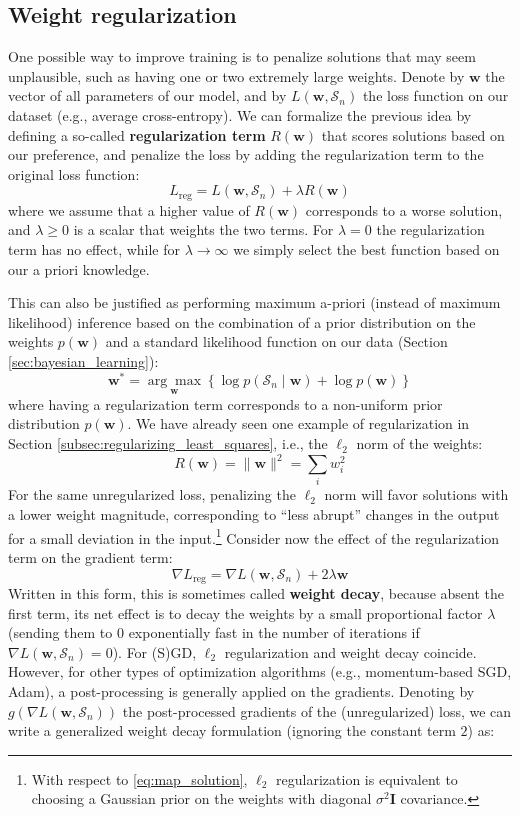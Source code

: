 \subsection{Weight regularization}

One possible way to improve training is to penalize solutions that may seem unplausible, such as having one or two extremely large weights. Denote by $\mathbf{w}$ the vector of all parameters of our model, and by $L(\mathbf{w}, \mathcal{S}_n)$ the loss function on our dataset (e.g., average cross-entropy). We can formalize the previous idea by defining a so-called \textbf{regularization term} $R(\mathbf{w})$ that scores solutions based on our preference, and penalize the loss by adding the regularization term to the original loss function:
%
$$
L_{\text{reg}}=L(\mathbf{w}, \mathcal{S}_n)+\lambda R(\mathbf{w})
$$
%
where we assume that a higher value of $R(\mathbf{w})$ corresponds to a worse solution, and $\lambda \ge 0$ is a scalar that weights the two terms. For $\lambda=0$ the regularization term has no effect, while for $\lambda \rightarrow \infty$ we simply select the best function based on our a priori knowledge.

This can also be justified as performing maximum a-priori (instead of maximum likelihood) inference based on the combination of a prior distribution on the weights $p(\mathbf{w})$ and a standard likelihood function on our data (Section \ref{sec:bayesian_learning}):
%
\begin{equation}
\mathbf{w}^*=\underset{\mathbf{w}}{\arg\max}\left\{ \log p(\mathcal{S}_n \;\vert\; \mathbf{w}) + \log p(\mathbf{w})\right\}
\label{eq:map_solution}
\end{equation}
%
where having a regularization term corresponds to a non-uniform prior distribution $p(\mathbf{w})$. We have already seen one example of regularization in Section \ref{subsec:regularizing_least_squares}, i.e., the $\ell_2$ norm of the weights:
%
$$
R(\mathbf{w})=\lVert \mathbf{w} \rVert^2 =\sum_i w_i^2
$$
%
For the same unregularized loss, penalizing the $\ell_2$ norm will favor solutions with a lower weight magnitude, corresponding to “less abrupt” changes in the output for a small deviation in the input.\footnote{With respect to \eqref{eq:map_solution},  $\ell_2$ regularization is equivalent to choosing a Gaussian prior on the weights with diagonal $\sigma^2 \mathbf{I}$ covariance.} Consider now the effect of the regularization term on the gradient term:
%
$$
\nabla L_{\text{reg}}=\nabla L(\mathbf{w},\mathcal{S}_n)+2\lambda\mathbf{w}
$$
%
Written in this form, this is sometimes called \textbf{weight decay}, because absent the first term, its net effect is to decay the weights by a small proportional factor $\lambda$ (sending them to $0$ exponentially fast in the number of iterations if $\nabla L(\mathbf{w}, \mathcal{S}_n)=0$). For (S)GD, $\ell_2$ regularization and weight decay coincide. However, for other types of optimization algorithms (e.g., momentum-based SGD, Adam), a post-processing is generally applied on the gradients. Denoting by $g(\nabla L(\mathbf{w}, \mathcal{S}_n))$ the post-processed gradients of the (unregularized) loss, we can write a generalized weight decay formulation (ignoring the constant term $2$) as:

